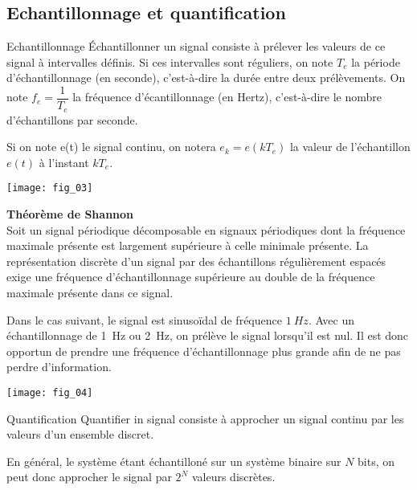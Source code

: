 \subsection{Echantillonnage et quantification}

\begin{defi}{Echantillonnage}
Échantillonner un signal consiste à prélever les valeurs de ce signal à intervalles définis. Si ces intervalles sont réguliers, on note $T_e$ la période d'échantillonnage (en seconde), c'est-à-dire la durée entre deux prélèvements. On note $f_e = \dfrac{1}{T_e}$ la fréquence d'écantillonnage (en Hertz), c'est-à-dire le nombre d'échantillons par seconde.

Si on note e(t) le signal continu, on notera $e_k = e(kT_e)$ la valeur de l'échantillon $e(t)$ à l'instant $kT_e$. 

\end{defi}

\begin{center}
\texttt{[image: fig\_03]}
\end{center}

\begin{theorem}{\small{\textsf{\textbf{Théorème de Shannon}}}} ~\\
Soit un signal périodique décomposable en signaux périodiques dont la fréquence maximale présente est largement supérieure à celle minimale présente.
La représentation discrète d’un signal par des échantillons régulièrement espacés exige une fréquence d’échantillonnage supérieure au double de la fréquence maximale présente dans ce signal.
\end{theorem}

Dans le cas suivant, le signal est sinusoïdal de fréquence $\SI{1}{Hz}$. Avec un échantillonnage de \SI{1}{Hz} ou \SI{2}{Hz}, on prélève le signal lorsqu'il est nul. Il est donc opportun de prendre une fréquence d'échantillonnage plus grande afin de ne pas perdre d'information. 
\begin{center}
\texttt{[image: fig\_04]}
\end{center}




\begin{defi}{Quantification}
Quantifier in signal consiste à approcher un signal continu par les valeurs d'un ensemble discret. 

En général, le système étant échantilloné sur un système binaire sur $N$ bits, on peut donc approcher le signal par $2^N$ valeurs discrètes.
\end{defi}


